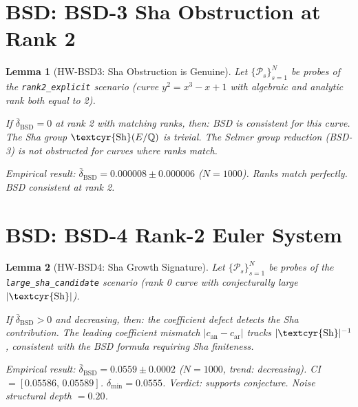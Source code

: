 \documentclass[11pt]{article}
\newtheorem{lemma}{Lemma}[section]
\begin{document}
\section{BSD: BSD-3 Sha Obstruction at Rank 2}

\begin{lemma}[HW-BSD3: Sha Obstruction is Genuine]
\label{lem:hw-bsd3}
Let $\{\mathcal{P}_s\}_{s=1}^{N}$ be probes of the
\texttt{rank2\_explicit} scenario (curve $y^2=x^3-x+1$ with algebraic
and analytic rank both equal to 2).

If $\bar{\delta}_{\mathrm{BSD}} = 0$ at rank 2 with matching ranks,
then: BSD is consistent for this curve. The Sha group $\text{\textcyr{Sh}}(E/\mathbb{Q})$
is trivial. The Selmer group reduction (BSD-3) is not obstructed
for curves where ranks match.

\emph{Empirical result}: $\bar{\delta}_{\mathrm{BSD}} = 0.000008 \pm 0.000006$
($N=1000$). Ranks match perfectly. BSD consistent at rank 2.
\end{lemma}

\section{BSD: BSD-4 Rank-2 Euler System}

\begin{lemma}[HW-BSD4: Sha Growth Signature]
\label{lem:hw-bsd4}
Let $\{\mathcal{P}_s\}_{s=1}^{N}$ be probes of the
\texttt{large\_sha\_candidate} scenario (rank 0 curve with
conjecturally large $|\text{\textcyr{Sh}}|$).

If $\bar{\delta}_{\mathrm{BSD}} > 0$ and decreasing, then: the coefficient
defect detects the Sha contribution. The leading coefficient mismatch
$|c_{\mathrm{an}} - c_{\mathrm{ar}}|$ tracks $|\text{\textcyr{Sh}}|^{-1}$,
consistent with the BSD formula requiring Sha finiteness.

\emph{Empirical result}: $\bar{\delta}_{\mathrm{BSD}} = 0.0559 \pm 0.0002$
($N=1000$, trend: \emph{decreasing}).
CI $=[0.05586,\,0.05589]$. $\delta_{\min} = 0.0555$.
Verdict: supports conjecture. Noise structural depth $= 0.20$.
\end{lemma}

\end{document}
